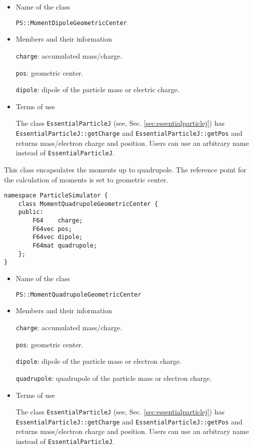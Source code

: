 \begin{itemize}

\item Name of the class

  \texttt{PS::MomentDipoleGeometricCenter}

\item Members and their information

  \texttt{charge}: accumulated mass/charge.

  \texttt{pos}: geometric center.

  \texttt{dipole}: dipole of the particle mass or electric charge.

\item Terms of use

  The class \texttt{EssentialParticleJ} (see, Sec. \ref{sec:essentialparticlej})
  has \texttt{EssentialParticleJ::getCharge} and \texttt{EssentialParticleJ::getPos}
  and returns mass/electron charge and position.
  Users can use an arbitrary name instead of \texttt{EssentialParticleJ}.

\end{itemize}

\label{sec:MomentQuadrupoleGeometricCenter}

This class encapsulates the moments up to quadrupole.
The reference point for the calculation of moments is set to geometric center.

\begin{screen}
\begin{verbatim}
namespace ParticleSimulator {
    class MomentQuadrupoleGeometricCenter {
    public:
        F64    charge;    
        F64vec pos;
        F64vec dipole;
        F64mat quadrupole;
    };
}
\end{verbatim}
\end{screen}

\begin{itemize}

\item Name of the class

  \texttt{PS::MomentQuadrupoleGeometricCenter}

\item Members and their information

  \texttt{charge}: accumulated mass/charge.

  \texttt{pos}: geometric center.

  \texttt{dipole}: dipole of the particle mass or electron charge.

  \texttt{quadrupole}: quadrupole of the particle mass or electron charge.

\item Terms of use

  The class \texttt{EssentialParticleJ} (see, Sec. \ref{sec:essentialparticlej})
  has \texttt{EssentialParticleJ::getCharge} and \texttt{EssentialParticleJ::getPos}
  and returns mass/electron charge and position.
  Users can use an arbitrary name instead of \texttt{EssentialParticleJ}.

\end{itemize}
  
